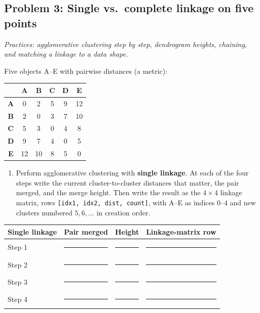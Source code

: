 \documentclass[
  11pt,
]{article}
\newcounter{none} %
\providecommand{\tightlist}{%
  \setlength{\itemsep}{0pt}\setlength{\parskip}{0pt}}
\newcommand{\blank}[1][1.2in]{\rule{#1}{0.4pt}}
\newcommand{\answerpage}{\clearpage}
\begin{document}
\answerpage

\subsection{Problem 3: Single vs.~complete linkage on five
points}\label{problem-3-single-vs.-complete-linkage-on-five-points}

\emph{Practices: agglomerative clustering step by step, dendrogram
heights, chaining, and matching a linkage to a data shape.}

Five objects A--E with pairwise distances (a metric):

{\def\LTcaptype{none} %
\begin{longtable}[]{@{}cccccc@{}}
\toprule\noalign{}
& A & B & C & D & E \\
\midrule\noalign{}
\endhead
\bottomrule\noalign{}
\endlastfoot
\textbf{A} & 0 & 2 & 5 & 9 & 12 \\
\textbf{B} & 2 & 0 & 3 & 7 & 10 \\
\textbf{C} & 5 & 3 & 0 & 4 & 8 \\
\textbf{D} & 9 & 7 & 4 & 0 & 5 \\
\textbf{E} & 12 & 10 & 8 & 5 & 0 \\
\end{longtable}
}

\begin{enumerate}
\def\labelenumi{(\alph{enumi})}
\tightlist
\item
  Perform agglomerative clustering with \textbf{single linkage}. At each
  of the four steps write the current cluster-to-cluster distances that
  matter, the pair merged, and the merge height. Then write the result
  as the \(4\times4\) linkage matrix, rows
  \texttt{{[}idx1,\ idx2,\ dist,\ count{]}}, with A--E as indices
  \(0\)--\(4\) and new clusters numbered \(5, 6, \dots\) in creation
  order.
\end{enumerate}

{\def\LTcaptype{none} %
\begin{longtable}[]{@{}llll@{}}
\toprule\noalign{}
Single linkage & Pair merged & Height & Linkage-matrix row \\
\midrule\noalign{}
\endhead
\bottomrule\noalign{}
\endlastfoot
Step 1 & \blank[1.2in] & \blank[0.7in] & \blank[2in] \\
Step 2 & \blank[1.2in] & \blank[0.7in] & \blank[2in] \\
Step 3 & \blank[1.2in] & \blank[0.7in] & \blank[2in] \\
Step 4 & \blank[1.2in] & \blank[0.7in] & \blank[2in] \\
\end{longtable}
}
\end{document}
